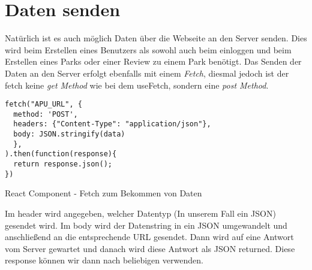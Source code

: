 \section{Daten senden}
\label{sendData}

Natürlich ist es auch möglich Daten über die Webseite an den Server senden. Dies wird beim 
Erstellen eines Benutzers als sowohl auch beim einloggen und beim Erstellen eines Parks oder einer 
Review zu einem Park benötigt. Das Senden der Daten an den Server erfolgt ebenfalls mit einem \textit{Fetch},
diesmal jedoch ist der fetch keine \textit{get Method} wie bei dem useFetch, sondern eine 
\textit{post Method}.
\begin{code}[htp]
\begin{lstlisting}
fetch("APU_URL", {
  method: 'POST',
  headers: {"Content-Type": "application/json"},
  body: JSON.stringify(data)
  },
).then(function(response){
  return response.json();
})
\end{lstlisting}
\caption{React Component - Fetch zum Bekommen von Daten}
\end{code}
\newpage
Im header wird angegeben, welcher Datentyp (In unserem Fall ein JSON) gesendet wird. Im body wird der 
Datenstring in ein JSON umgewandelt und anschließend an die entsprechende URL gesendet. Dann wird auf 
eine Antwort vom Server gewartet und danach wird diese Antwort als JSON returned. 
Diese response können wir dann nach beliebigen verwenden.
